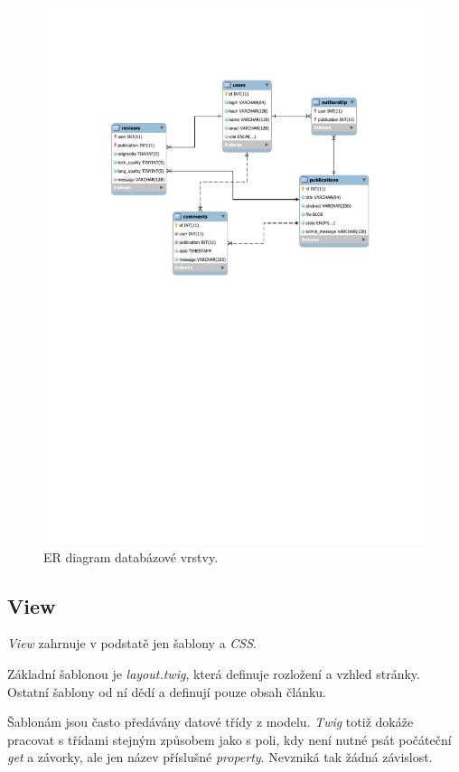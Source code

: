 \documentclass[12pt, a4paper]{article}
\begin{document}
\begin{figure}
	\centering
	\includegraphics[width=1.2\linewidth,trim={3cm 13cm 0 3cm},clip]{schema}
	\caption{ER diagram databázové vrstvy.}
	\label{fig:schema}
\end{figure}


\subsection{View}
\emph{View} zahrnuje v podstatě jen šablony a \emph{CSS}.

Základní šablonou je \emph{layout.twig}, která definuje rozložení a vzhled stránky. Ostatní šablony od ní dědí a definují pouze obsah článku.

Šablonám jsou často předávány datové třídy z modelu. \emph{Twig} totiž dokáže pracovat s třídami stejným způsobem jako s poli, kdy není nutné psát počáteční \emph{get} a závorky, ale jen název příslušné \emph{property}. Nevzniká tak žádná závislost.
\end{document}
